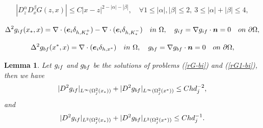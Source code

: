 \documentclass[10pt,a4paper]{amsart}
\newtheorem{lemma}{Lemma}
\begin{document}
\begin{align}
|D_z^{\alpha}D_x^{\beta}G(z,x)|\leq C|x-z|^{2-|\alpha|-|\beta|},\quad \forall 1\leq |\alpha|,|\beta|\leq 2,~3\leq |\alpha|+|\beta|\leq 4,\label{pe-G-bi}
\end{align}

\begin{align}
\Delta^2g_{{\rm if}}(x_{\ast},x)=\nabla\cdot({\bm e}_i\delta_{h,K^+_{\ast}})-\nabla\cdot({\bm e}_i\delta_{h,K^-_{\ast}})\quad {\rm in}~\Omega,\quad
g_{{\rm if}}=\nabla g_{{\rm if}}\cdot{\bm n}=0\quad {\rm on}~\partial\Omega,\label{rG-bi}
\end{align}

\begin{align}
\Delta^2g_{{\rm bf}}(x^{\ast},x)=\nabla\cdot({\bm e}_i\delta_{h,x^{\ast}})\quad {\rm in}~\Omega,\quad g_{{\rm bf}}=\nabla g_{{\rm bf}}\cdot{\bm n}=0\quad {\rm on}~\partial\Omega,\label{rG1-bi}
\end{align}

\begin{lemma}\label{rG-bi-lee}
Let $g_{{\rm if}}$ and $g_{{\rm bf}}$ be the solutions of problems (\ref{rG-bi}) and (\ref{rG1-bi}), then we have
\begin{align}
|D^2g_{{\rm if}}|_{L^{\infty}(\Omega_j^2(x_{\ast}))}+|D^2g_{{\rm bf}}|_{L^{\infty}(\Omega_j^2(x^{\ast}))}\leq Chd_j^{-2},
\end{align}
and
\begin{align}
|D^2g_{{\rm if}}|_{L^2(\Omega_j^2(x_{\ast}))}+|D^2g_{{\rm bf}}|_{L^2(\Omega_j^2(x^{\ast}))}\leq Chd_j^{-1}.
\end{align}
\end{lemma}
\end{document}
